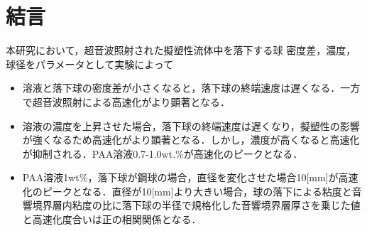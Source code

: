 \section{結言}
本研究において，超音波照射された擬塑性流体中を落下する球
密度差，濃度，球径をパラメータとして実験によって

\begin{itemize}
    \item 溶液と落下球の密度差が小さくなると，落下球の終端速度は遅くなる．一方で超音波照射による高速化がより顕著となる．
    \item 溶液の濃度を上昇させた場合，落下球の終端速度は遅くなり，擬塑性の影響が強くなるため高速化がより顕著となる．しかし，濃度が高くなると高速化が抑制される．PAA溶液0.7-1.0wt.\%が高速化のピークとなる．
    \item PAA溶液1wt\%，落下球が鋼球の場合，直径を変化させた場合10[mm]が高速化のピークとなる．直径が10[mm]より大きい場合，球の落下による粘度と音響境界層内粘度の比に落下球の半径で規格化した音響境界層厚さを乗じた値と高速化度合いは正の相関関係となる．
\end{itemize}